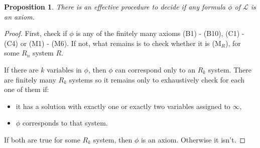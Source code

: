 \documentclass{article}
\newtheorem*{proposition}{Proposition}
\newcommand{\lang}{\mathcal{L}}
\begin{document}
\begin{proposition}
  There is an effective procedure to decide if any formula $\phi$ of $\lang$ is an axiom.
\end{proposition}
\begin{proof}
  First, check if $\phi$ is any of the finitely many axioms (B1) - (B10), (C1) - (C4) or (M1) - (M6). If not, what remains is to check whether it is (M$_R$), for some $R_n$ system $R$.

  If there are $k$ variables in $\phi$, then $\phi$ can correspond only to an $R_k$ system. There are finitely many $R_k$ systems so it remains only to exhaustively check for each one of them if:
  \begin{itemize}
  \item it has a solution with exactly one or exactly two variables assigned to $\infty$,
  \item $\phi$ corresponds to that system.
  \end{itemize}
  If both are true for some $R_k$ system, then $\phi$ is an axiom. Otherwise it isn't.
\end{proof}
\end{document}
